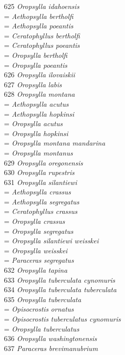 \documentclass[
]{article}
\begin{document}
625 \emph{Oropsylla idahoensis}\\
= \emph{Aethopsylla bertholfi}\\
= \emph{Aethopsylla poeantis}\\
= \emph{Ceratophyllus bertholfi}\\
= \emph{Ceratophyllus poeantis}\\
= \emph{Oropsylla bertholfi}\\
= \emph{Oropsylla poeantis}\\
626 \emph{Oropsylla ilovaiskii}\\
627 \emph{Oropsylla labis}\\
628 \emph{Oropsylla montana}\\
= \emph{Aethopsylla acutus}\\
= \emph{Aethopsylla hopkinsi}\\
= \emph{Oropsylla acutus}\\
= \emph{Oropsylla hopkinsi}\\
= \emph{Oropsylla montana mandarina}\\
= \emph{Oropsylla montanus}\\
629 \emph{Oropsylla oregonensis}\\
630 \emph{Oropsylla rupestris}\\
631 \emph{Oropsylla silantiewi}\\
= \emph{Aethopsylla crassus}\\
= \emph{Aethopsylla segregatus}\\
= \emph{Ceratophyllus crassus}\\
= \emph{Oropsylla crassus}\\
= \emph{Oropsylla segregatus}\\
= \emph{Oropsylla silantiewi weisskei}\\
= \emph{Oropsylla weisskei}\\
= \emph{Paraceras segregatus}\\
632 \emph{Oropsylla tapina}\\
633 \emph{Oropsylla tuberculata cynomuris}\\
634 \emph{Oropsylla tuberculata tuberculata}\\
635 \emph{Oropsylla tuberculata}\\
= \emph{Opisocrostis ornatus}\\
= \emph{Opisocrostis tuberculatus cynomuris}\\
= \emph{Oropsylla tuberculatus}\\
636 \emph{Oropsylla washingtonensis}\\
637 \emph{Paraceras brevimanubrium}\\
\end{document}
